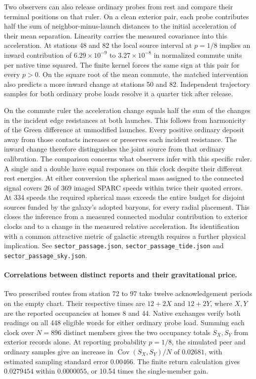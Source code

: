 \documentclass[11pt]{article}
\begin{document}
Two observers can also release ordinary probes from rest and compare
their terminal positions on that ruler. On a clean exterior pair,
each probe contributes half the sum of neighbor-minus-launch
distances to the initial acceleration of their mean separation.
Linearity carries the measured covariance into this acceleration.
At stations 48 and 82 the local source interval at \(p=1/8\) implies
an inward contribution of \(6.29\times10^{-9}\) to
\(3.27\times10^{-8}\) in normalized commute units per native time squared.
The finite kernel forces the same sign at this pair for every \(p>0\).
On the square root of the mean commute, the matched intervention
also predicts a more inward change at stations 50 and 82.
Independent trajectory samples for both ordinary probe loads
resolve it a quarter tick after release.

On the commute ruler the acceleration change equals half the sum of
the changes in the incident edge resistances at both launches.
This follows from harmonicity of the Green difference at unmodified
launches. Every positive ordinary deposit away from those contacts
increases or preserves each incident resistance. The inward change
therefore distinguishes the joint source from that ordinary calibration.
The comparison concerns what observers infer with this specific ruler.
A single and a double have equal responses on this clock despite
their different rest energies. At either conversion the spherical
mass assigned to the connected signal covers 26 of 369 imaged SPARC
speeds within twice their quoted errors. At 334 speeds the required spherical mass exceeds the
entire budget for disjoint sources funded by the galaxy's adopted
baryons, for every radial placement.
This closes the inference from a measured connected modular
contribution to exterior clocks and to a change in the measured
relative acceleration. Its identification with a common
attractive metric of galactic strength requires a further physical
implication. See \texttt{sector\_passage.json},
\texttt{sector\_passage\_tide.json} and
\texttt{sector\_passage\_sky.json}.

\paragraph{Correlations between distinct reports and their gravitational price.}
Two prescribed routes from station 72 to 97 take twelve
acknowledgement periods on the empty chart. Their respective times
are \(12+2X\) and \(12+2Y\), where \(X,Y\) are the reported
occupancies at homes 8 and 44. Native exchanges verify both readings
on all 448 eligible words for either ordinary probe load.
Summing each clock over \(N=896\) distinct members gives the two
occupancy totals \(S_X,S_Y\) from exterior records alone.
At reporting probability \(p=1/8\), the simulated peer and ordinary
samples give an increase in \(\operatorname{Cov}(S_X,S_Y)/N\)
of \(0.02681\), with estimated sampling standard error \(0.00466\).
The finite return calculation gives \(0.0279454\) within
\(0.0000055\), or 10.54 times the single-member gain.
\end{document}

